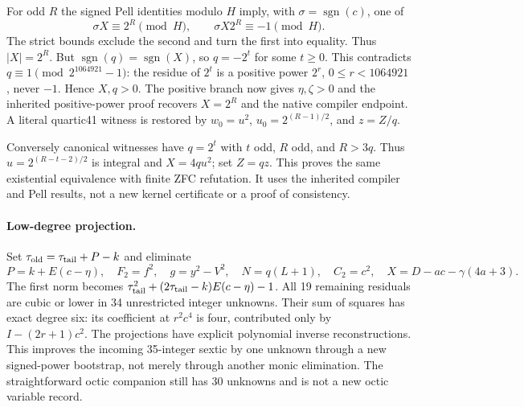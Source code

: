 For odd $R$ the signed Pell identities modulo $H$ imply, with
$\sigma=\operatorname{sgn}(c)$, one of
\[
 \sigma X\equiv2^R\pmod H,
 \qquad \sigma X2^R\equiv-1\pmod H.
\]
The strict bounds exclude the second and turn the first into equality.
Thus $|X|=2^R$. But $\operatorname{sgn}(q)=\operatorname{sgn}(X)$,
so $q=-2^t$ for some $t\ge0$. This contradicts
$q\equiv1\pmod{2^{1064921}-1}$: the residue of $2^t$ is a positive
power $2^r$, $0\le r<1064921$, never $-1$.
Hence $X,q>0$.
The positive branch now gives $\eta,\zeta>0$ and the inherited
positive-power proof recovers $X=2^R$ and the native compiler endpoint.
A literal quartic41 witness is restored by
$w_0=u^2$, $u_0=2^{(R-1)/2}$, and $z=Z/q$.

Conversely canonical witnesses have $q=2^t$ with $t$ odd,
$R$ odd, and $R>3q$. Thus
$u=2^{(R-t-2)/2}$ is integral and $X=4qu^2$; set $Z=qz$.
This proves the same existential equivalence with finite ZFC refutation.
It uses the inherited compiler and Pell results, not a new kernel
certificate or a proof of consistency.

\paragraph{Low-degree projection.}
Set $\tau_{\rm old}=\tau_{\rm tail}+P-k$ and eliminate
\[
 P=k+E(c-\eta),\quad F_2=f^2,\quad g=y^2-V^2,\quad
 N=q(L+1),\quad C_2=c^2,\quad X=D-ac-\gamma(4a+3).
\]
The first norm becomes
$\tau_{\rm tail}^2+(2\tau_{\rm tail}-k)E(c-\eta)-1$.
All 19 remaining residuals are cubic or lower in 34 unrestricted integer
unknowns. Their sum of squares has exact degree six: its coefficient at
$r^2c^4$ is four, contributed only by $I-(2r+1)c^2$.
The projections have explicit polynomial inverse reconstructions.
This improves the incoming 35-integer sextic by one unknown through a
new signed-power bootstrap, not merely through another monic elimination.
The straightforward octic companion still has 30 unknowns and is not a
new octic variable record.

